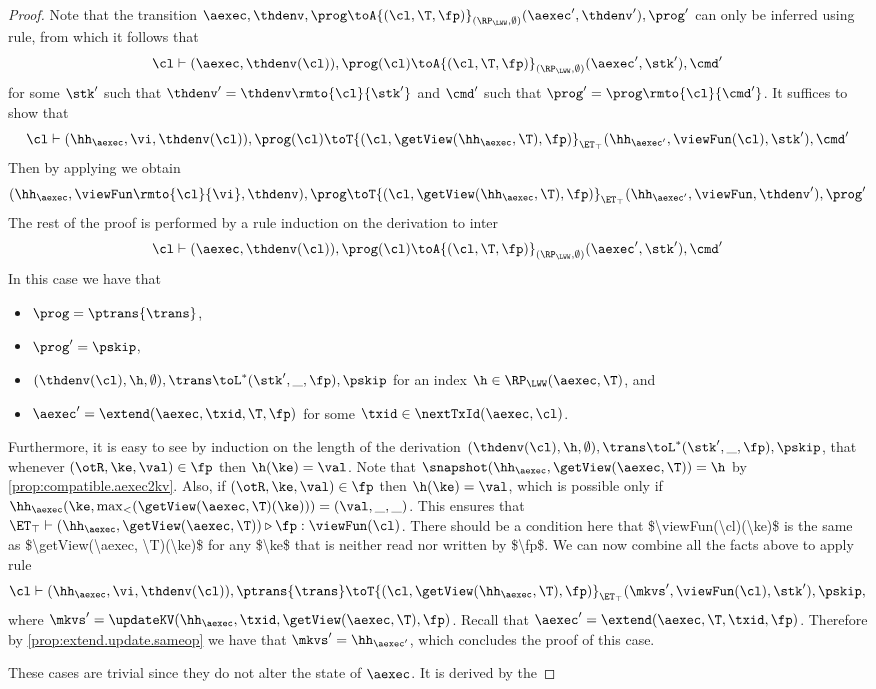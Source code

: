 \begin{proof}
Note that the transition 
$\aexec, \thdenv, \prog \toA{(\cl, \T, \fp)}_{(\RP_{\LWW}, \emptyset)} (\aexec', \thdenv'), \prog'$ 
can only be inferred using  rule, 
from which it follows that 
\[
    \cl \vdash (\aexec, \thdenv(\cl)), \prog(\cl) 
    \toA{(\cl, \T, \fp)}_{(\RP_{\LWW}, \emptyset)} (\aexec' ,\stk'), \cmd'
\]
for some $\stk'$ such that $\thdenv' = \thdenv\rmto{\cl}{\stk'}$ 
and $\cmd'$ such that $\prog' = \prog\rmto{\cl}{\cmd'}$.
It suffices to show that 
\[
    \cl \vdash (\hh_\aexec, \vi, \thdenv(\cl)), \prog(\cl) 
   \toT{(\cl, \getView(\hh_{\aexec}, \T), \fp)}_{\ET_{\top}} 
    (\hh_{\aexec'}, \viewFun(\cl), \stk'), \cmd'
\]
Then by applying  we obtain 
\[
    (\hh_{\aexec}, \viewFun\rmto{\cl}{\vi}, \thdenv), \prog 
    \toT{(\cl, \getView(\hh_{\aexec}, \T), \fp)}_{\ET_{\top}} 
    (\hh_{\aexec'}, \viewFun, \thdenv'), \prog'
\]
The rest of the proof is performed by a rule induction on the derivation to inter 
\[ 
    \cl \vdash (\aexec, \thdenv(\cl)), \prog(\cl) 
    \toA{(\cl, \T, \fp)}_{(\RP_{\LWW}, \emptyset)} (\aexec', \stk'), \cmd'
\]
In this case we have that 
\begin{itemize}
    \item $\prog = \ptrans{\trans}$, 
    \item $\prog' = \pskip$, 
    \item $(\thdenv(\cl), \h, \emptyset), \trans \toL^{\ast} (\stk', \_, \fp), \pskip$ for an index $\h \in \RP_{\LWW}(\aexec, \T)$, and 
    \item $\aexec' = \extend(\aexec, \txid, \T, \fp)$ for some $\txid \in \nextTxId(\aexec, \cl)$. 
\end{itemize}
Furthermore, it is easy to see by induction on the length of the derivation 
$(\thdenv(\cl), \h, \emptyset), \trans \toL^{\ast} (\stk', \_, \fp), \pskip$, 
that whenever $(\otR, \ke, \val) \in \fp$ then $\h(\ke) = \val$.
Note that $\snapshot(\hh_{\aexec}, \getView(\aexec, \T)) = \h$ by \cref{prop:compatible.aexec2kv}.
Also, if $(\otR,\ke, \val) \in \fp$ then $\h(\ke) = \val$, which is possible only if  
$\hh_{\aexec}(\ke, \max_{<}(\getView(\aexec, \T)(\ke))) = (\val, \_, \_)$.
This ensures that $\ET_{\top} \vdash (\hh_{\aexec}, \getView(\aexec, \T)) \triangleright \fp: \viewFun(\cl)$. 
\ac{There should be a condition here that $\viewFun(\cl)(\ke)$ is the same as $\getView(\aexec, \T)(\ke)$ 
for any $\ke$ that is neither read nor written by $\fp$.} 
We can now combine all the facts above to apply rule 
\[
    \cl \vdash (\hh_{\aexec}, \vi, \thdenv(\cl)), \ptrans{\trans}
    \toT{(\cl, \getView(\hh_{\aexec}, \T), \fp)}_{\ET_{\top}} 
    (\mkvs', \viewFun(\cl), \stk'), \pskip, 
\] 
where $\mkvs' = \updateKV(\hh_{\aexec}, \txid, \getView(\aexec, \T), \fp)$. 
Recall that $\aexec' = \extend(\aexec, \T, \txid, \fp)$. 
Therefore by \cref{prop:extend.update.sameop} we have that $\mkvs' = \hh_{\aexec'}$, 
which concludes the proof of this case.

These cases are trivial since they do not alter the state of \( \aexec \).
It is derived by the \ih
\end{proof}

